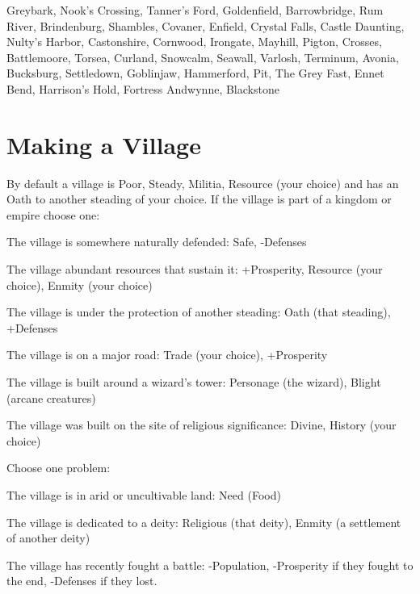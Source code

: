 Greybark, Nook’s Crossing, Tanner’s Ford, Goldenfield, Barrowbridge, Rum River, Brindenburg, Shambles, Covaner, Enfield, Crystal Falls, Castle Daunting, Nulty's Harbor, Castonshire, Cornwood, Irongate, Mayhill, Pigton, Crosses, Battlemoore, Torsea, Curland, Snowcalm, Seawall, Varlosh, Terminum, Avonia, Bucksburg, Settledown, Goblinjaw, Hammerford, Pit, The Grey Fast, Ennet Bend, Harrison’s Hold, Fortress Andwynne, Blackstone

 
\section{Making a Village}   
 

By default a village is Poor, Steady, Militia, Resource (your choice) and has an Oath to another steading of your choice. If the village is part of a kingdom or empire choose one:

 
\startitemize[1,packed]

\item The village is somewhere naturally defended: Safe, -Defenses

 
\item The village abundant resources that sustain it: +Prosperity, Resource (your choice), Enmity (your choice)

 
\item The village is under the protection of another steading: Oath (that steading), +Defenses

 
\item The village is on a major road: Trade (your choice), +Prosperity

 
\item The village is built around a wizard's tower: Personage (the wizard), Blight (arcane creatures)

 
\item The village was built on the site of religious significance: Divine, History (your choice)


\stopitemize
 

Choose one problem:

 
\startitemize[1,packed]

\item The village is in arid or uncultivable land: Need (Food)

 
\item The village is dedicated to a deity: Religious (that deity), Enmity (a settlement of another deity)

 
\item The village has recently fought a battle: -Population, -Prosperity if they fought to the end, -Defenses if they lost.

